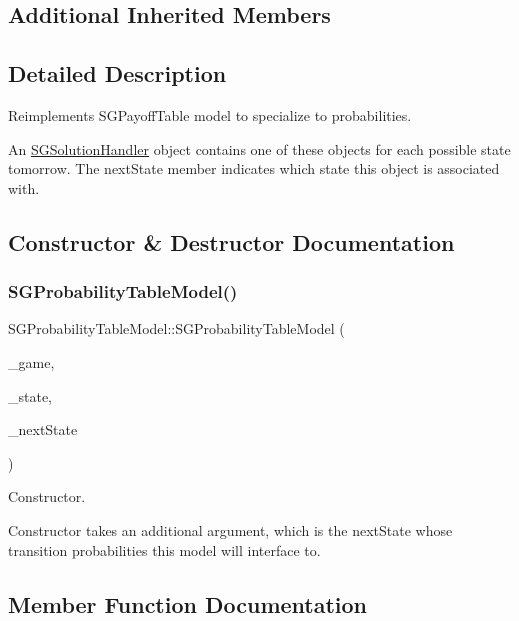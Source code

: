 \subsection*{Additional Inherited Members}


\subsection{Detailed Description}
Reimplements S\+G\+Payoff\+Table model to specialize to probabilities. 

An \hyperlink{classSGSolutionHandler}{S\+G\+Solution\+Handler} object contains one of these objects for each possible state tomorrow. The next\+State member indicates which state this object is associated with. 

\subsection{Constructor \& Destructor Documentation}
\mbox{\label{classSGProbabilityTableModel_a31bfe886c2f733a547b2973e729a953c}} 
\subsubsection{\texorpdfstring{S\+G\+Probability\+Table\+Model()}{SGProbabilityTableModel()}}
{\footnotesize\ttfamily S\+G\+Probability\+Table\+Model\+::\+S\+G\+Probability\+Table\+Model (\begin{DoxyParamCaption}\item[{\hyperlink{classSGGame}{S\+G\+Game} $\ast$}]{\+\_\+game,  }\item[{int}]{\+\_\+state,  }\item[{int}]{\+\_\+next\+State }\end{DoxyParamCaption})\hspace{0.3cm}{\ttfamily [inline]}}



Constructor. 

Constructor takes an additional argument, which is the next\+State whose transition probabilities this model will interface to. 

\subsection{Member Function Documentation}
\mbox{\label{classSGProbabilityTableModel_a28e4eb8b523f04220d65dd92261759e4}} 
